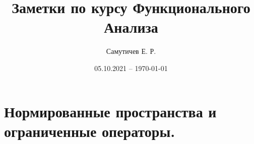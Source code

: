 \documentclass[12pt,a4paper]{article}
\title{Заметки по курсу Функционального Анализа}
\author{Самутичев Е. Р.}
\date{05.10.2021 -- \today{}}
\theoremstyle{definition}
\begin{document}
\maketitle

\section{Нормированные пространства и ограниченные операторы.}



\end{document}
